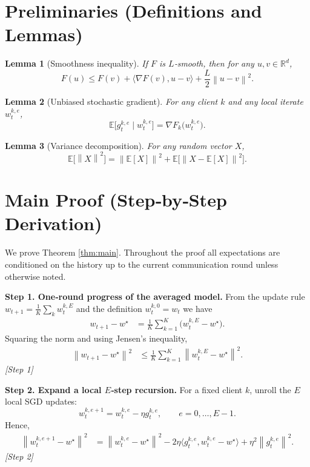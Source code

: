 \documentclass{article}
\newtheorem{lemma}{Lemma}
\newcommand{\EE}{\mathbb{E}}
\newcommand{\norm}[1]{\left\lVert#1\right\rVert}
\newcommand{\grad}{\nabla}
\newcommand{\RR}{\mathbb{R}}
\begin{document}
\section*{Preliminaries (Definitions and Lemmas)}
\begin{lemma}[Smoothness inequality]\label{lem:smooth}
If $F$ is $L$‑smooth, then for any $u,v\in\RR^d$,
\[
F(u)\le F(v)+\langle \grad F(v),u-v\rangle+\frac{L}{2}\norm{u-v}^2 .
\]
\end{lemma}
\begin{lemma}[Unbiased stochastic gradient]\label{lem:unbiased}
For any client $k$ and any local iterate $w_{t}^{k,e}$,
\[
\EE\!\bigl[g_{t}^{k,e}\mid w_{t}^{k,e}\bigr]=\grad F_k\!\bigl(w_{t}^{k,e}\bigr).
\]
\end{lemma}
\begin{lemma}[Variance decomposition]\label{lem:var}
For any random vector $X$,
\[
\EE\!\bigl[\norm{X}^2\bigr]=\norm{\EE[X]}^2+\EE\!\bigl[\norm{X-\EE[X]}^2\bigr].
\]
\end{lemma}

\section*{Main Proof (Step‑by‑Step Derivation)}
We prove Theorem \ref{thm:main}. Throughout the proof all expectations are conditioned on the history up to the current communication round unless otherwise noted.

\bigskip
\noindent\textbf{Step 1. One‑round progress of the averaged model.}  
From the update rule $w_{t+1}= \frac1K\sum_{k} w_{t}^{k,E}$ and the definition $w_{t}^{k,0}=w_t$ we have
\begin{align}
w_{t+1}-w^\star
&= \frac1K\sum_{k=1}^K\bigl(w_{t}^{k,E}-w^\star\bigr) .
\end{align}
Squaring the norm and using Jensen’s inequality,
\begin{align}
\norm{w_{t+1}-w^\star}^2
&\le \frac1K\sum_{k=1}^K \norm{w_{t}^{k,E}-w^\star}^2 . \tag{1}
\end{align}
\textit{[Step 1]}

\bigskip
\noindent\textbf{Step 2. Expand a local $E$‑step recursion.}  
For a fixed client $k$, unroll the $E$ local SGD updates:
\[
w_{t}^{k,e+1}= w_{t}^{k,e}-\eta g_{t}^{k,e},
\qquad e=0,\dots,E-1 .
\]
Hence,
\begin{align}
\norm{w_{t}^{k,e+1}-w^\star}^2
&= \norm{w_{t}^{k,e}-w^\star}^2 
 -2\eta\langle g_{t}^{k,e}, w_{t}^{k,e}-w^\star\rangle
 +\eta^2\norm{g_{t}^{k,e}}^2 . \tag{2}
\end{align}
\textit{[Step 2]}
\end{document}
